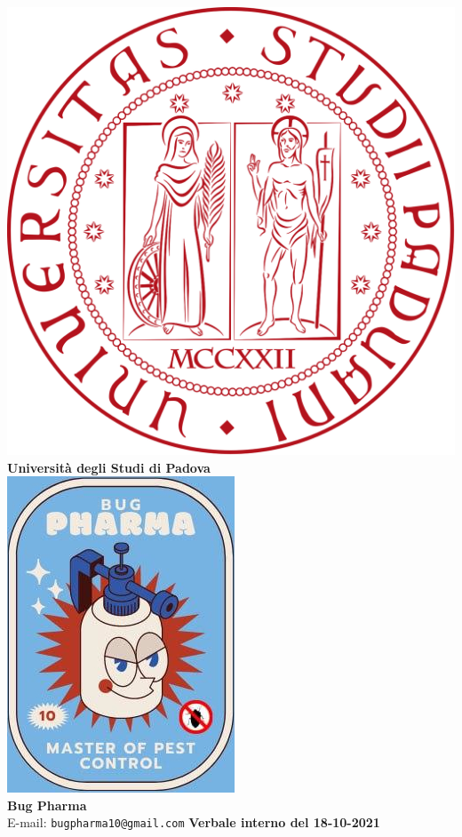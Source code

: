 \documentclass[11pt]{article}
\begin{document}
	\thispagestyle{empty}
	\begin{titlepage}
		\begin{center}
			\includegraphics[scale = 0.05]{../../logo_unipd.png}\\
			\large \textbf{Università degli Studi di Padova} \\
			\vfill
			\includegraphics[scale = 0.7]{../../logo_small.jpg}\\
			\large \textbf{Bug Pharma} \\
			\vfill
			\large
			E-mail: 
			\texttt{bugpharma10@gmail.com}
			\vfill
			\Huge \textbf{Verbale interno del 18-10-2021}\\
			

\end{center}
\end{titlepage}
\end{document}
